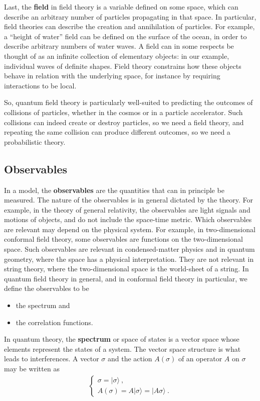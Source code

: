 \documentclass[12pt, a4paper, notitlepage, twoside]{report}
\numberwithin{equation}{section}
\theoremstyle{break}
\begin{document}
Last, the \textbf{\boldmath field} in field theory is a variable defined on some space, which can describe an arbitrary number of particles propagating in that space.
In particular, field theories can describe the creation and annihilation of particles.
For example, a ``height of water'' field can be defined on the surface of the ocean, in order to describe arbitrary numbers of water waves.
A field can in some respects be thought of as an infinite collection of elementary objects: in our example, individual waves of definite shapes.
Field theory constrains how these objects behave in relation with the underlying space, for instance by requiring interactions to be local.

So, quantum field theory is particularly well-suited to predicting the outcomes of collisions of particles, whether in the cosmos or in a particle accelerator.
Such collisions can indeed create or destroy particles, so we need a field theory, and repeating the same collision can produce different outcomes, so we need a probabilistic theory. 

\subsection{Observables}

In a model, the \textbf{\boldmath observables} are the quantities that can in principle be measured.
The nature of the observables is in general dictated by the theory.
For example, in the theory of general relativity, the observables are light signals and motions of objects, and do not include the space-time metric. 
Which observables are relevant may depend on the physical system.
For example, in two-dimensional conformal field theory, some observables are functions on the two-dimensional space.
Such observables are relevant in condensed-matter physics and in quantum geometry, where the space has a physical interpretation.
They are not relevant in string theory, where the two-dimensional space is the world-sheet of a string. 
In quantum field theory in general, and in conformal field theory in particular, we define the observables to be 
\begin{itemize}
 \item the spectrum and
\item the correlation functions.
\end{itemize}

In quantum theory, the \textbf{\boldmath spectrum} or space of states is a vector space whose elements represent the states of a system.
The vector space structure is what leads to interferences.
A vector $\sigma$ and the action $A(\sigma)$ of an operator $A$ on $\sigma$ may be written as 
\begin{align}
\left\{\begin{array}{l} 
 \sigma = |\sigma\rangle\ , \\ A(\sigma) = A|\sigma\rangle = |A\sigma\rangle\ .
\end{array}\right. 
\end{align}
\end{document}
